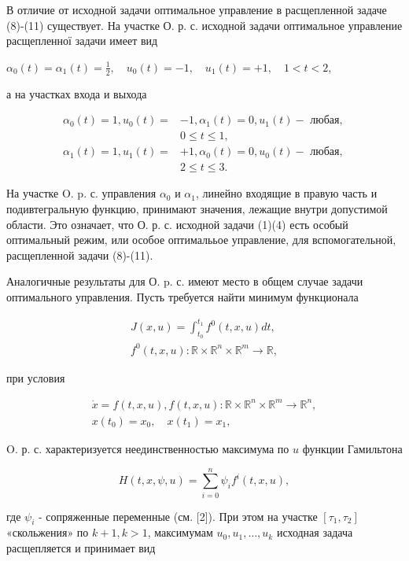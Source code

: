 \documentclass[10pt]{article}
\begin{document}
В отличие от исходной задачи оптимальное управление в расщепленной задаче (8)-(11) существует. На участке О. р. с. исходной задачи оптимальное управление расщепленної задачи имеет вид

$\alpha_{0}(t)=\alpha_{1}(t)=\frac{1}{2}, \quad u_{0}(t)=-1, \quad u_{1}(t)=+1, \quad 1<t<2$,

а на участках входа и выхода

\[
\begin{aligned}
\alpha_{0}(t)=1, u_{0}(t)= & -1, \alpha_{1}(t)=0, u_{1}(t)-\text { любая, } \\
& 0 \leqslant t \leqslant 1, \\
\alpha_{1}(t)=1, u_{1}(t)= & +1, \alpha_{0}(t)=0, u_{0}(t)-\text { любая, } \\
& 2 \leqslant t \leqslant 3 .
\end{aligned}
\]

На участке O. p. с. управления $\alpha_{0}$ и $\alpha_{1}$, линейно входящие в правую часть и подивтегральную функцию, принимают значения, лежащие внутри допустимой области. Это означает, что О. р. с. исходной задачи (1)(4) есть особый оптимальный режим, или особое оптималььое управление, для вспомогательной, расщепленной задачи (8)-(11).

Аналогичные результаты для О. p. с. имеют место в общем случае задачи оптимального управления. Пусть требуется найти минимум функционала

\[
\begin{gathered}
J(x, u)=\int_{t_{0}}^{t_{1}} f^{0}(t, x, u) d t, \\
f^{0}(t, x, u): \mathbb{R} \times \mathbb{R}^{n} \times \mathbb{R}^{m} \rightarrow \mathbb{R},
\end{gathered}
\]

при условия

\[
\begin{gathered}
\dot{x}=f(t, x, u), f(t, x, u): \mathbb{R} \times \mathbb{R}^{n} \times \mathbb{R}^{m} \rightarrow \mathbb{R}^{n}, \\
x\left(t_{0}\right)=x_{0}, \quad x\left(t_{1}\right)=x_{1},
\end{gathered}
\]

O. р. с. характеризуется неединственностью максимума по $u$ функции Гамильтона

\[
H(t, x, \psi, u)=\sum_{i=0}^{n} \psi_{i} f^{i}(t, x, u),
\]

где $\psi_{i}$ - сопряженные переменные (см. [2]). При этом на участке $\left[\tau_{1}, \tau_{2}\right]$ «скольжения» по $k+1, k>1$, максимумам $u_{0}, u_{1}, \ldots, u_{k}$ исходная задача расщепляется и принимает вид
\end{document}

